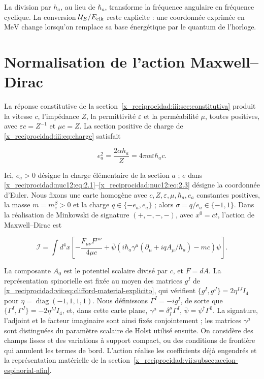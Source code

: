La division par \(h_a\), au lieu de \(\hbar_a\), transforme la fréquence angulaire en fréquence cyclique. La conversion \(\mathcal U_E/E_{\rm clk}\) reste explicite : une coordonnée exprimée en \(\mathrm{MeV}\) change lorsqu’on remplace sa base énergétique par le quantum de l’horloge.

\section{Normalisation de l’action Maxwell--Dirac}

La réponse constitutive de la section~\ref{x_reciprocidad:iii:sec:constitutiva} produit la vitesse \(c\), l’impédance \(Z\), la permittivité \(\varepsilon\) et la perméabilité \(\mu\), toutes positives, avec \(\varepsilon c=Z^{-1}\) et \(\mu c=Z\). La section positive de charge de \eqref{x_reciprocidad:iii:eq:charge} satisfait



\begin{equation}
e_a^2=\frac{2\alpha h_a}{Z}
=4\pi\alpha\varepsilon\hbar_a c .
\label{x_reciprocidad:nuc12:eq:3.1}
\end{equation}



Ici, \(e_a>0\) désigne la charge élémentaire de la section \(a\) ; \(e\) dans \eqref{x_reciprocidad:nuc12:eq:2.1}--\eqref{x_reciprocidad:nuc12:eq:2.3} désigne la coordonnée d’Euler. Nous fixons une carte homogène avec \(c,Z,\varepsilon,\mu,\hbar_a,e_a\) constantes positives, la masse \(m=m_e^\beta>0\) et la charge \(q\in\{-e_a,e_a\}\) ; alors \(\sigma=q/e_a\in\{-1,1\}\). Dans la réalisation de Minkowski de signature \((+,-,-,-)\), avec \(x^0=ct\), l’action de Maxwell--Dirac est




\begin{equation}
\mathcal I=\int d^4x\left[
-\frac{F_{\mu\nu}F^{\mu\nu}}{4\mu c}
+\bar\psi\left(i\hbar_a\gamma^\mu
(\partial_\mu+iqA_\mu/\hbar_a)-mc\right)\psi
\right].
\label{x_reciprocidad:nuc12:eq:3.2}
\end{equation}



La composante \(A_0\) est le potentiel scalaire divisé par \(c\), et \(F=dA\). La représentation spinorielle est fixée au moyen des matrices \(g^I\) de \eqref{x_reciprocidad:vii:eq:clifford-material-explicito}, qui vérifient \(\{g^I,g^J\}=2\eta^{IJ}I_4\) pour \(\eta=\operatorname{diag}(-1,1,1,1)\). Nous définissons \(\Gamma^I=-ig^I\), de sorte que \(\{\Gamma^I,\Gamma^J\}=-2\eta^{IJ}I_4\), et, dans cette carte plane, \(\gamma^\mu=\delta^\mu_I\Gamma^I\), \(\bar\psi=\psi^\dagger\Gamma^0\). La signature, l’adjoint et le facteur imaginaire sont ainsi fixés conjointement ; les matrices \(\gamma^\mu\) sont distinguées du paramètre scalaire de Holst utilisé ensuite. On considère des champs lisses et des variations à support compact, ou des conditions de frontière qui annulent les termes de bord. L’action réalise les coefficients déjà engendrés et la représentation matérielle de la section~\ref{x_reciprocidad:vii:subsec:accion-espinorial-afin}.

